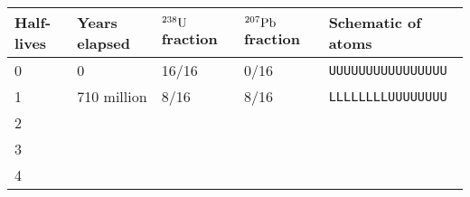 \documentclass[11pt]{article}
\begin{document}
\begin{center}
\begin{tabular}{|l|l|l|l|l|}
	\hline
	Half-lives & Years elapsed & ${}^{238}\rm U$ fraction & ${}^{207}\rm Pb$ fraction & Schematic of atoms                          \\ \hline
	0                                   & 0                              & 16/16                                            & 0/16                                          & {\tt UUUUUUUUUUUUUUUU} \\\hline
	1                                   & 710 million                    & 8/16                                             & 8/16                                          & {\tt LLLLLLLLUUUUUUUU} \\\hline
	2                                   &                                &                                                  &                                               &                                             \\\hline
	3                                   &                                &                                                  &                                               &                                             \\\hline
	4                                   &                                &                                                  &                                               &                                             \\\hline
\end{tabular}
\end{center}
\end{document}
